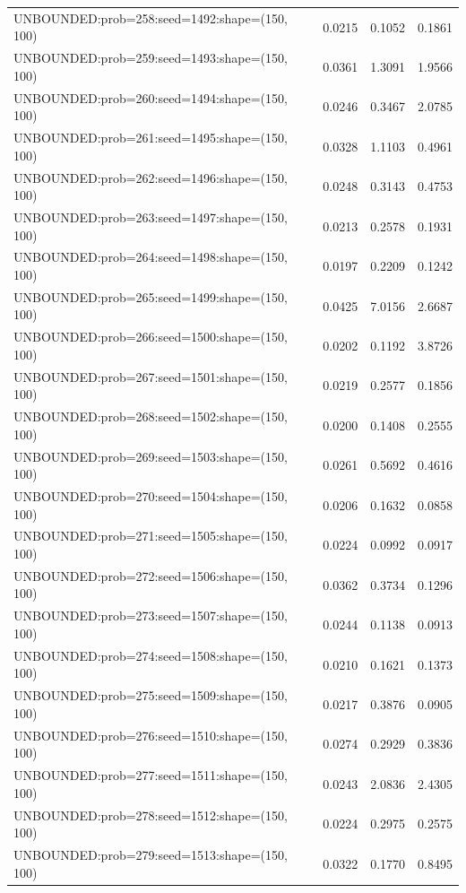 \begin{longtable}{lccc}
UNBOUNDED:prob=258:seed=1492:shape=(150, 100) &   0.0215 &  0.1052 &  0.1861 \\
UNBOUNDED:prob=259:seed=1493:shape=(150, 100) &   0.0361 &  1.3091 &  1.9566 \\
UNBOUNDED:prob=260:seed=1494:shape=(150, 100) &   0.0246 &  0.3467 &  2.0785 \\
UNBOUNDED:prob=261:seed=1495:shape=(150, 100) &   0.0328 &  1.1103 &  0.4961 \\
UNBOUNDED:prob=262:seed=1496:shape=(150, 100) &   0.0248 &  0.3143 &  0.4753 \\
UNBOUNDED:prob=263:seed=1497:shape=(150, 100) &   0.0213 &  0.2578 &  0.1931 \\
UNBOUNDED:prob=264:seed=1498:shape=(150, 100) &   0.0197 &  0.2209 &  0.1242 \\
UNBOUNDED:prob=265:seed=1499:shape=(150, 100) &   0.0425 &  7.0156 &  2.6687 \\
UNBOUNDED:prob=266:seed=1500:shape=(150, 100) &   0.0202 &  0.1192 &  3.8726 \\
UNBOUNDED:prob=267:seed=1501:shape=(150, 100) &   0.0219 &  0.2577 &  0.1856 \\
UNBOUNDED:prob=268:seed=1502:shape=(150, 100) &   0.0200 &  0.1408 &  0.2555 \\
UNBOUNDED:prob=269:seed=1503:shape=(150, 100) &   0.0261 &  0.5692 &  0.4616 \\
UNBOUNDED:prob=270:seed=1504:shape=(150, 100) &   0.0206 &  0.1632 &  0.0858 \\
UNBOUNDED:prob=271:seed=1505:shape=(150, 100) &   0.0224 &  0.0992 &  0.0917 \\
UNBOUNDED:prob=272:seed=1506:shape=(150, 100) &   0.0362 &  0.3734 &  0.1296 \\
UNBOUNDED:prob=273:seed=1507:shape=(150, 100) &   0.0244 &  0.1138 &  0.0913 \\
UNBOUNDED:prob=274:seed=1508:shape=(150, 100) &   0.0210 &  0.1621 &  0.1373 \\
UNBOUNDED:prob=275:seed=1509:shape=(150, 100) &   0.0217 &  0.3876 &  0.0905 \\
UNBOUNDED:prob=276:seed=1510:shape=(150, 100) &   0.0274 &  0.2929 &  0.3836 \\
UNBOUNDED:prob=277:seed=1511:shape=(150, 100) &   0.0243 &  2.0836 &  2.4305 \\
UNBOUNDED:prob=278:seed=1512:shape=(150, 100) &   0.0224 &  0.2975 &  0.2575 \\
UNBOUNDED:prob=279:seed=1513:shape=(150, 100) &   0.0322 &  0.1770 &  0.8495 \\

\end{longtable}
